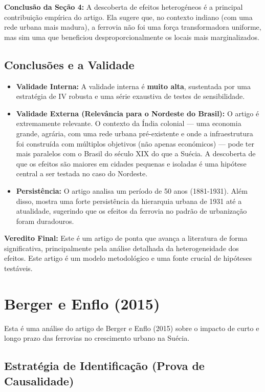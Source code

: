 \documentclass[12pt, a4paper]{article}
\begin{document}
\noindent\textbf{Conclusão da Seção 4:} A descoberta de efeitos heterogéneos é a principal contribuição empírica do artigo. Ela sugere que, no contexto indiano (com uma rede urbana mais madura), a ferrovia não foi uma força transformadora uniforme, mas sim uma que beneficiou desproporcionalmente os locais mais marginalizados.

\subsection{Conclusões e a Validade}
\begin{itemize}
    \item \textbf{Validade Interna:} A validade interna é \textbf{muito alta}, sustentada por uma estratégia de IV robusta e uma série exaustiva de testes de sensibilidade.
    \item \textbf{Validade Externa (Relevância para o Nordeste do Brasil):} O artigo é extremamente relevante. O contexto da Índia colonial — uma economia grande, agrária, com uma rede urbana pré-existente e onde a infraestrutura foi construída com múltiplos objetivos (não apenas económicos) — pode ter mais paralelos com o Brasil do século XIX do que a Suécia. A descoberta de que os efeitos são maiores em cidades pequenas e isoladas é uma hipótese central a ser testada no caso do Nordeste.
    \item \textbf{Persistência:} O artigo analisa um período de 50 anos (1881-1931). Além disso, mostra uma forte persistência da hierarquia urbana de 1931 até a atualidade, sugerindo que os efeitos da ferrovia no padrão de urbanização foram duradouros.
\end{itemize}

\noindent\textbf{Veredito Final:} Este é um artigo de ponta que avança a literatura de forma significativa, principalmente pela análise detalhada da heterogeneidade dos efeitos. Este artigo é um modelo metodológico e uma fonte crucial de hipóteses testáveis.

\section{Berger e Enflo (2015)}
Esta é uma análise do artigo de Berger e Enflo (2015) sobre o impacto de curto e longo prazo das ferrovias no crescimento urbano na Suécia. 

\subsection{Estratégia de Identificação (Prova de Causalidade)}
\end{document}
